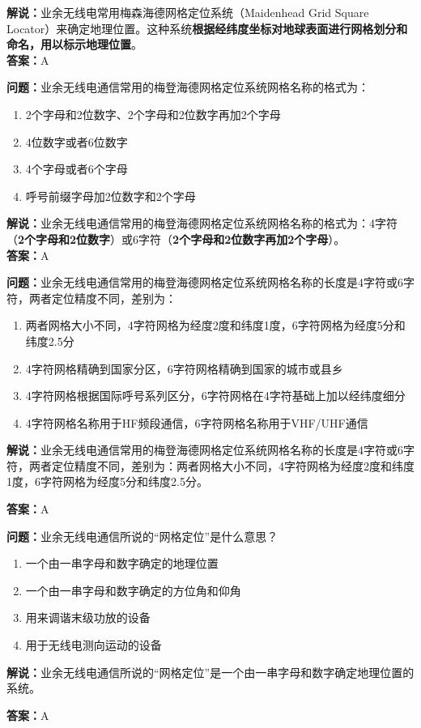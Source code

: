 \textbf{解说：}业余无线电常用梅森海德网格定位系统（Maidenhead Grid Square Locator）来确定地理位置。这种系统\textbf{根据经纬度坐标对地球表面进行网格划分和命名，用以标示地理位置}。\\\textbf{答案：}A



\textbf{问题：}业余无线电通信常用的梅登海德网格定位系统网格名称的格式为：

\begin{enumerate}[label=\Alph*), leftmargin=1cm]
	\item 2个字母和2位数字、2个字母和2位数字再加2个字母
	\item 4位数字或者6位数字
	\item 4个字母或者6个字母
	\item 呼号前缀字母加2位数字和2个字母
\end{enumerate}

\textbf{解说：}业余无线电通信常用的梅登海德网格定位系统网格名称的格式为：4字符（\textbf{2个字母和2位数字}）或6字符（\textbf{2个字母和2位数字再加2个字母}）。\\\textbf{答案：}A



\textbf{问题：}业余无线电通信常用的梅登海德网格定位系统网格名称的长度是4字符或6字符，两者定位精度不同，差别为：

\begin{enumerate}[label=\Alph*), leftmargin=1cm]
	\item 两者网格大小不同，4字符网格为经度2度和纬度1度，6字符网格为经度5分和纬度2.5分
	\item 4字符网格精确到国家分区，6字符网格精确到国家的城市或县乡
	\item 4字符网格根据国际呼号系列区分，6字符网格在4字符基础上加以经纬度细分
	\item 4字符网格名称用于HF频段通信，6字符网格名称用于VHF/UHF通信
\end{enumerate}

\textbf{解说：}业余无线电通信常用的梅登海德网格定位系统网格名称的长度是4字符或6字符，两者定位精度不同，差别为：两者网格大小不同，4字符网格为经度2度和纬度1度，6字符网格为经度5分和纬度2.5分。

\textbf{答案：}A

\textbf{问题：}业余无线电通信所说的“网格定位”是什么意思？

\begin{enumerate}[label=\Alph*), leftmargin=1cm]
	\item 一个由一串字母和数字确定的地理位置
	\item 一个由一串字母和数字确定的方位角和仰角
	\item 用来调谐末级功放的设备
	\item 用于无线电测向运动的设备
\end{enumerate}

\textbf{解说：}业余无线电通信所说的“网格定位”是一个由一串字母和数字确定地理位置的系统。

\textbf{答案：}A